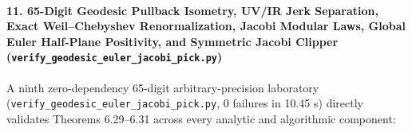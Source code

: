 \documentclass[
  11pt,
]{article}
\begin{document}
\paragraph{\texorpdfstring{11. 65-Digit Geodesic Pullback Isometry,
UV/IR Jerk Separation, Exact Weil--Chebyshev Renormalization, Jacobi
Modular Laws, Global Euler Half-Plane Positivity, and Symmetric Jacobi
Clipper
(\texttt{verify\_geodesic\_euler\_jacobi\_pick.py})}{11. 65-Digit Geodesic Pullback Isometry, UV/IR Jerk Separation, Exact Weil--Chebyshev Renormalization, Jacobi Modular Laws, Global Euler Half-Plane Positivity, and Symmetric Jacobi Clipper (verify\_geodesic\_euler\_jacobi\_pick.py)}}\label{digit-geodesic-pullback-isometry-uvir-jerk-separation-exact-weilchebyshev-renormalization-jacobi-modular-laws-global-euler-half-plane-positivity-and-symmetric-jacobi-clipper-verify_geodesic_euler_jacobi_pick.py}

A ninth zero-dependency 65-digit arbitrary-precision laboratory
(\texttt{verify\_geodesic\_euler\_jacobi\_pick.py}, 0 failures in 10.45
s) directly validates Theorems 6.29--6.31 across every analytic and
algorithmic component:
\end{document}
